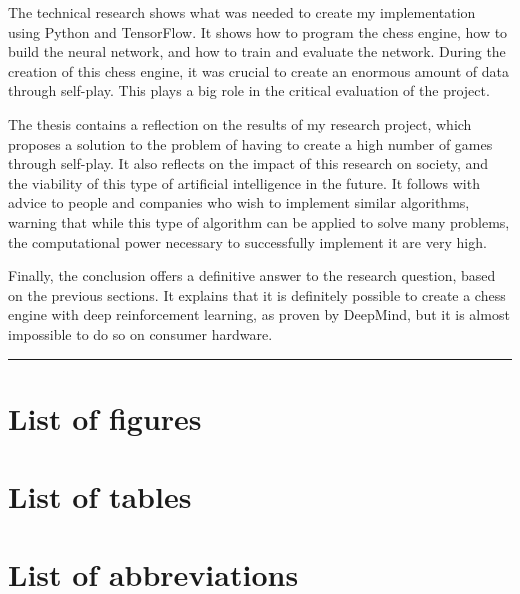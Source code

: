 \documentclass{article}
\makeatletter
\renewcommand\tableofcontents{%
  \null\hfill\textbf{\Huge\contentsname}\hfill\null\par
  \vline\noexpand\rule{\textwidth}{1pt}%
  \@mkboth{\MakeUppercase\contentsname}{\MakeUppercase\contentsname}%
  \@starttoc{toc}%
}
\makeatother
\begin{document}
The technical research shows what was needed to create my implementation using Python and TensorFlow. 
It shows how to program the chess engine, how to build the neural network, and how to train and evaluate the network.
During the creation of this chess engine, it was crucial to create an enormous amount of data through self-play.
This plays a big role in the critical evaluation of the project. 

The thesis contains a reflection on the results of my research project, which proposes a solution to the problem of
having to create a high number of games through self-play. It also reflects on the impact of this research on society, and the
viability of this type of artificial intelligence in the future. 
It follows with advice to people and companies who wish to implement similar algorithms, warning that while this type of 
algorithm can be applied to solve many problems, the computational power necessary to successfully implement it are very high. 

Finally, the conclusion offers a definitive answer to the research question, based on the previous sections.
It explains that it is definitely possible to create a chess engine with deep reinforcement learning, as proven by DeepMind,
but it is almost impossible to do so on consumer hardware. 

\newpage
\thispagestyle{empty}
\mbox{}
\newpage

\tableofcontents
\newpage

\section*{List of figures}
\renewcommand{\listfigurename}{}
\listoffigures

\section*{List of tables}
\renewcommand{\listtablename}{}
\listoftables

\newpage
\section*{List of abbreviations}
\end{document}
